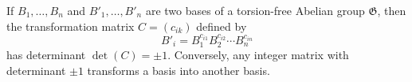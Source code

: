 If $B_1, \ldots, B_n$ and $B'_1, \ldots, B'_n$ are two bases of a torsion-free Abelian group $\mathfrak{G}$, then the transformation matrix $C = (c_{ik})$ defined by
$$B'_i = B_1^{c_{i1}} B_2^{c_{i2}} \cdots B_n^{c_{in}}$$
has determinant $\det(C) = \pm 1$. Conversely, any integer matrix with determinant $\pm 1$ transforms a basis into another basis.
